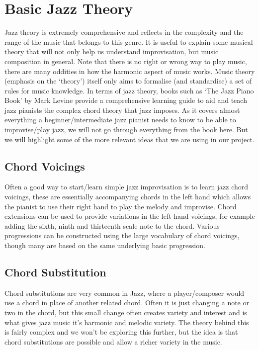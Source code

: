 \documentclass[pdftex,12pt,a4paper]{report}
\begin{document}
\section{Basic Jazz Theory}
Jazz theory is extremely comprehensive and reflects in the complexity and the range of the music that belongs to this genre. It is useful to explain some musical theory that will not only help us understand improvisation, but music composition in general. Note that there is no right or wrong way to play music, there are many oddities in how the harmonic aspect of music works. Music theory (emphasis on the `theory') itself only aims to formalise (and standardise) a set of rules for music knowledge. In terms of jazz theory, books such as `The Jazz Piano Book' by Mark Levine provide a comprehensive learning guide to aid and teach jazz pianists the complex chord theory that jazz imposes. As it covers almost everything a beginner/intermediate jazz pianist needs to know to be able to improvise/play jazz, we will not go through everything from the book here. But we will highlight some of the more relevant ideas that we are using in our project.

\subsection{Chord Voicings}
Often a good way to start/learn simple jazz improvisation is to learn jazz chord voicings, these are essentially accompanying chords in the left hand which allows the pianist to use their right hand to play the melody and improvise. Chord extensions can be used to provide variations in the left hand voicings, for example adding the sixth, ninth and thirteenth scale note to the chord. Various progressions can be constructed using the large vocabulary of chord voicings, though many are based on the same underlying basic progression.

\subsection{Chord Substitution}
Chord substitutions are very common in Jazz, where a player/composer would use a chord in place of another related chord. Often it is just changing a note or two in the chord, but this small change often creates variety and interest and is what gives jazz music it's harmonic and melodic variety. The theory behind this is fairly complex and we won't be exploring this further, but the idea is that chord substitutions are possible and allow a richer variety in the music.
\end{document}
